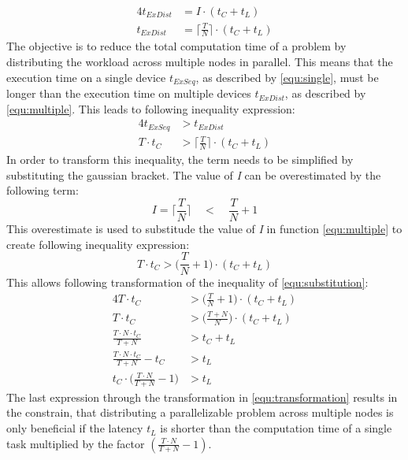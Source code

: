 \begin{alignat}{4}
  t_{ExDist} &= I \cdot (t_{C} + t_{L}) \nonumber \\
  t_{ExDist} &= \bigg\lceil\frac{T}{N}\bigg\rceil \cdot (t_{C} + t_{L})
  \label{equ:multiple}
\end{alignat}
The objective is to reduce the total computation time of a problem by distributing the workload across multiple nodes in parallel. This means that the execution time on a single device $t_{ExSeq}$, as described by \eqref{equ:single}, must be longer than the execution time on multiple devices $t_{ExDist}$, as described by \eqref{equ:multiple}. This leads to following inequality expression:
\begin{alignat}{4}
  t_{ExSeq} &> t_{ExDist} \nonumber \\
  T \cdot t_{C} &> \bigg\lceil\frac{T}{N}\bigg\rceil \cdot (t_{C} + t_{L})
  \label{equ:compare}
\end{alignat}
In order to transform this inequality, the term needs to be simplified by substituting the gaussian bracket. The value of \emph{I} can be overestimated by the following term:
\begin{equation}
  I = \bigg\lceil\frac{T}{N}\bigg\rceil \quad < \quad \frac{T}{N} + 1
  \label{equ:frac2}
\end{equation}
This overestimate is used to substitude the value of \emph{I} in function \ref{equ:multiple} to create following inequality expression:
\begin{equation}
  T \cdot t_{C} > \bigg(\frac{T}{N} + 1\bigg) \cdot (t_{C} + t_{L})
  \label{equ:substitution}
\end{equation}
This allows following transformation of the inequality of \ref{equ:substitution}:
\begin{alignat}{4}
  T \cdot t_{C} &> \bigg(\frac{T}{N} + 1\bigg) \cdot (t_{C} + t_{L}) \nonumber \\
  T \cdot t_{C} &> \bigg(\frac{T + N}{N}\bigg) \cdot (t_{C} + t_{L}) \nonumber \\
  \frac{T \cdot N \cdot t_{C}}{T + N} &> t_{C} + t_{L} \nonumber \\
  \frac{T \cdot N \cdot t_{C}}{T + N} - t_{C} &> t_{L} \nonumber \\
  t_{C} \cdot \bigg(\frac{T \cdot N}{T + N} - 1\bigg) &> t_{L}
  \label{equ:transformation}
\end{alignat}
The last expression through the transformation in \eqref{equ:transformation} results in the constrain, that distributing a parallelizable problem across multiple nodes is only beneficial if the latency $t_{L}$ is shorter than the computation time of a single task multiplied by the factor $(\frac{T \cdot N}{T + N} - 1)$.

